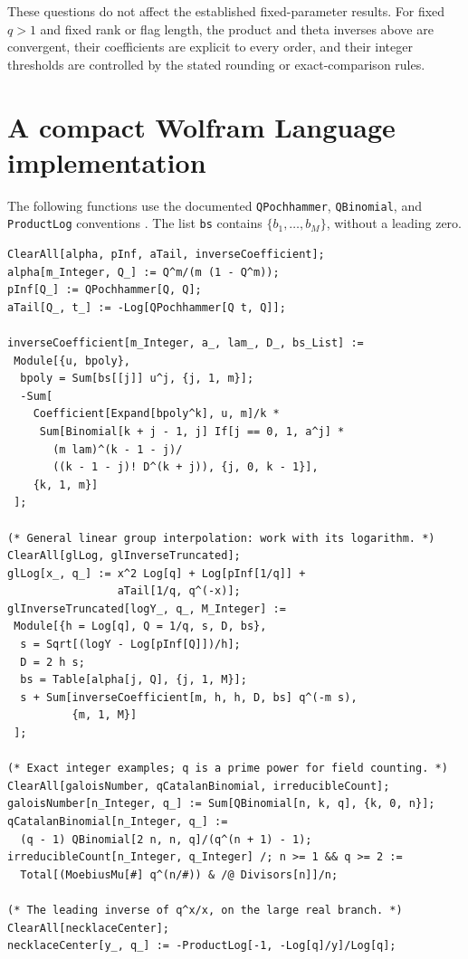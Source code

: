 \documentclass[11pt]{article}
\numberwithin{equation}{section}
\theoremstyle{definition}
\begin{document}
These questions do not affect the established fixed-parameter results. For fixed $q>1$ and fixed rank or flag length, the product and theta inverses above are convergent, their coefficients are explicit to every order, and their integer thresholds are controlled by the stated rounding or exact-comparison rules.

\appendix
\section{A compact Wolfram Language implementation}
\label{app:wolfram}

The following functions use the documented \texttt{QPochhammer},
\texttt{QBinomial}, and \texttt{ProductLog} conventions
\cite{wolframpoch,wolframqbin,wolframW}. The list \texttt{bs} contains
$\{b_1,\ldots,b_M\}$, without a leading zero.

\begin{lstlisting}
ClearAll[alpha, pInf, aTail, inverseCoefficient];
alpha[m_Integer, Q_] := Q^m/(m (1 - Q^m));
pInf[Q_] := QPochhammer[Q, Q];
aTail[Q_, t_] := -Log[QPochhammer[Q t, Q]];

inverseCoefficient[m_Integer, a_, lam_, D_, bs_List] :=
 Module[{u, bpoly},
  bpoly = Sum[bs[[j]] u^j, {j, 1, m}];
  -Sum[
    Coefficient[Expand[bpoly^k], u, m]/k *
     Sum[Binomial[k + j - 1, j] If[j == 0, 1, a^j] *
       (m lam)^(k - 1 - j)/
       ((k - 1 - j)! D^(k + j)), {j, 0, k - 1}],
    {k, 1, m}]
 ];

(* General linear group interpolation: work with its logarithm. *)
ClearAll[glLog, glInverseTruncated];
glLog[x_, q_] := x^2 Log[q] + Log[pInf[1/q]] +
                 aTail[1/q, q^(-x)];
glInverseTruncated[logY_, q_, M_Integer] :=
 Module[{h = Log[q], Q = 1/q, s, D, bs},
  s = Sqrt[(logY - Log[pInf[Q]])/h];
  D = 2 h s;
  bs = Table[alpha[j, Q], {j, 1, M}];
  s + Sum[inverseCoefficient[m, h, h, D, bs] q^(-m s),
          {m, 1, M}]
 ];

(* Exact integer examples; q is a prime power for field counting. *)
ClearAll[galoisNumber, qCatalanBinomial, irreducibleCount];
galoisNumber[n_Integer, q_] := Sum[QBinomial[n, k, q], {k, 0, n}];
qCatalanBinomial[n_Integer, q_] :=
  (q - 1) QBinomial[2 n, n, q]/(q^(n + 1) - 1);
irreducibleCount[n_Integer, q_Integer] /; n >= 1 && q >= 2 :=
  Total[(MoebiusMu[#] q^(n/#)) & /@ Divisors[n]]/n;

(* The leading inverse of q^x/x, on the large real branch. *)
ClearAll[necklaceCenter];
necklaceCenter[y_, q_] := -ProductLog[-1, -Log[q]/y]/Log[q];
\end{lstlisting}
\end{document}
